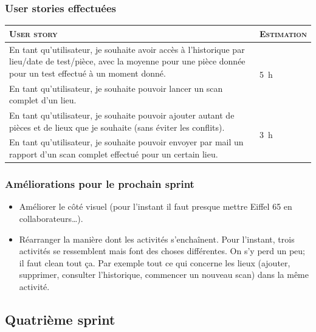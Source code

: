 \documentclass{elsarticle}
\newcommand{\est}[1]{\multirow{2}{*}{\SI{#1}{\hour}}}
\newcommand{\estbis}[1]{\SI{#1}{\hour}}
\begin{document}
\subsubsection{User stories effectuées}
\begin{table}[H]
	\centering
	\begin{tabular}{p{14cm}m{2cm}}
		\toprule
		\textsc{User story} & \textsc{Estimation}\\
		\midrule
		En tant qu'utilisateur, je souhaite avoir accès à l'historique par lieu/date de test/pièce, avec la moyenne pour une pièce donnée pour un test effectué à un moment donné. & \est{5}\\
		\midrule
		En tant qu'utilisateur, je souhaite pouvoir lancer un scan complet d'un lieu. & \estbis{15}\\
		\midrule
		En tant qu'utilisateur, je souhaite pouvoir ajouter autant de pièces et de lieux que je souhaite (sans éviter les conflits). & \est{3}\\
		\midrule
		En tant qu'utilisateur, je souhaite pouvoir envoyer par mail un rapport d'un scan complet effectué pour un certain lieu. & \est{4}\\
		\bottomrule
	\end{tabular}
\end{table}

\subsubsection{Améliorations pour le prochain sprint}
\begin{itemize}
	\item Améliorer le côté visuel (pour l'instant il faut presque mettre Eiffel 65 en collaborateurs\ldots).
	\item Réarranger la manière dont les activités s’enchaînent.
	Pour l’instant, trois activités se ressemblent mais font des choses différentes.
	On s’y perd un peu; il faut clean tout ça.
	Par exemple tout ce qui concerne les lieux (ajouter, supprimer, consulter l'historique, commencer un nouveau scan) dans la même activité.
\end{itemize}

\subsection{Quatrième sprint}
\end{document}
